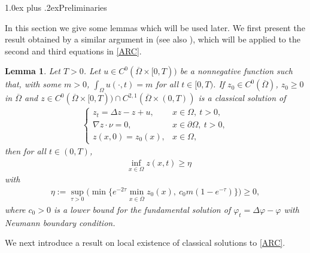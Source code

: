 \documentclass[12pt,reqno,draft]{article}
\makeatletter
\renewcommand{\section}{%
\@startsection{section}{1}{\z@}
{0.5truecm plus -1ex minus -.2ex}%
{1.0ex plus .2ex}{\bfseries\large}}
\numberwithin{equation}{section}
\theoremstyle{theorem}
\newtheorem{lem}[thm]{Lemma}
\theoremstyle{definition}
\newcommand{\pa}{\partial}
\newcommand{\cl}[1]{{\overline#1}}
\makeatother
\begin{document}
\section{Preliminaries} \label{Sec2}

In this section we give some lemmas which will be used later. 
We first present the result obtained by a similar argument in \cite[Lemma 2.2]{F-2015} 
(see also \cite[Lemma 2.1 and Remark 2.2]{MY-2017}),  which will be applied to the second and third equations in \eqref{ARC}. 
%
\begin{lem}\label{LB}
Let $T>0$. 
Let $u \in C^0(\cl{\Omega} \times [0,T))$ be a nonnegative function 
such that, with some $m>0$, $\int_\Omega u(\cdot, t)=m$ for all 
$t \in [0, T)$. 
If $z_0 \in C^0(\cl{\Omega})$, 
$z_0\ge0$ in $\cl{\Omega}$ and 
$z \in 
C^0(\cl{\Omega} \times [0,T)) \cap C^{2,1}(\cl{\Omega} \times (0,T))$ 
is a classical solution of
    \begin{align*}
        \begin{cases}
        z_t=\Delta z-z+u,
        &x \in \Omega,\ t>0,
    \\[1.05mm]
        \nabla z \cdot \nu=0, 
        &x \in \pa \Omega,\ t>0,
    \\[1.05mm]
        z(x, 0)=z_0(x), 
        &x \in \Omega,
        \end{cases}
    \end{align*}
then for all $t \in (0, T)$, 
%
\begin{align*}
   &\inf_{x \in \Omega} z(x, t) \ge \eta
\end{align*}
%
with
\begin{align}\label{eta}
\eta:=\sup_{\tau>0}\Big(\min
         \Big\{e^{-2\tau}\min_{x \in \cl{\Omega}}z_0(x),\ 
         c_0m(1-e^{-\tau})\Big\}\Big)\ge0,
\end{align}
where $c_0>0$ is a lower bound for the fundamental solution of 
$\varphi_t=\Delta\varphi-\varphi$ with Neumann boundary condition. 
\end{lem}
%
We next introduce a result on local existence of classical solutions 
to \eqref{ARC}.
%
\end{document}
